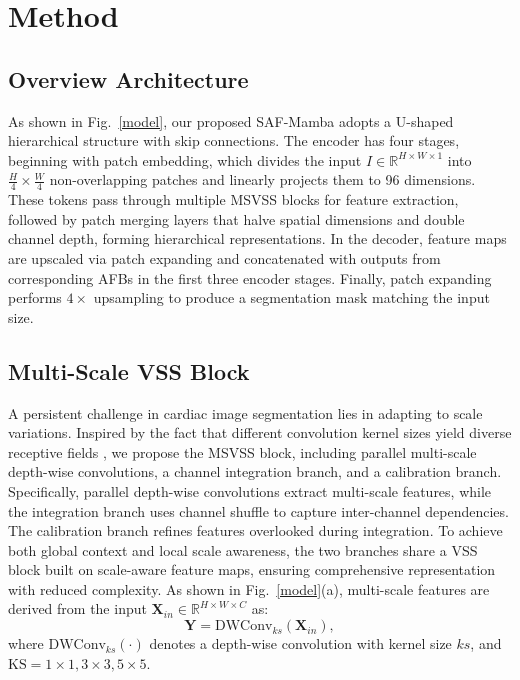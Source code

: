 \documentclass[conference]{IEEEtran}
\begin{document}
\section{Method}

\subsection{Overview Architecture}
As shown in Fig.~\ref{model}, our proposed SAF-Mamba adopts a U-shaped hierarchical structure with skip connections. The encoder has four stages, beginning with patch embedding, which divides the input $I \in \mathbb{R}^{H \times W \times 1}$ into $\frac{H}{4} \times \frac{W}{4}$ non-overlapping patches and linearly projects them to 96 dimensions. These tokens pass through multiple MSVSS blocks for feature extraction, followed by patch merging layers that halve spatial dimensions and double channel depth, forming hierarchical representations. In the decoder, feature maps are upscaled via patch expanding and concatenated with outputs from corresponding AFBs in the first three encoder stages. Finally, patch expanding performs $4\times$ upsampling to produce a segmentation mask matching the input size.


\subsection{Multi-Scale VSS Block}
A persistent challenge in cardiac image segmentation lies in adapting to scale variations. Inspired by the fact that different convolution kernel sizes yield diverse receptive fields \cite{10006743}, we propose the MSVSS block, including parallel multi-scale depth-wise convolutions, a channel integration branch, and a calibration branch. Specifically, parallel depth-wise convolutions\cite{EMCADEfficientMultiscale2024} extract multi-scale features, while the integration branch uses channel shuffle\cite{ShuffleNetExtremelyEfficient2017} to capture inter-channel dependencies. The calibration branch refines features overlooked during integration. To achieve both global context and local scale awareness, the two branches share a VSS block built on scale-aware feature maps, ensuring comprehensive representation with reduced complexity. As shown in Fig.~\ref{model}(a), multi-scale features are derived from the input $\textbf{X}_{in} \in \mathbb{R}^{H \times {W} \times {C}}$ as:
\begin{equation}
\textbf{Y} =\text{DWConv}_{ks}(\textbf{X}_{in}),
\end{equation}
where $\text{DWConv}_{ks}(\cdot)$ denotes a depth-wise convolution with kernel size $ks$, and $\text{KS}={1\times1, 3\times3, 5\times5}$.
\end{document}
